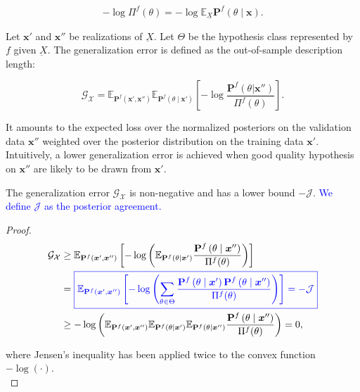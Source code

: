 $$
    - \log \Pi^f (\theta) = - \log \mathbb{E}_{\underline{X}} \mathbf{P}^f (\theta \mid \bm{x}).
$$

\begin{definition}
    Let $\bm{x'}$ and $\bm{x''}$ be realizations of $\underbar{X}$.
    Let $\Theta$ be the hypothesis class represented by $f$ given $\underbar{X}$. 
    The generalization error is defined as the out-of-sample description length:

    $$
        \mathcal{G}_{\mathcal{X}} = \mathbb{E}_{\mathbf{P}^f(\bm{x}', \bm{x}'')} \mathbb{E}_{\mathbf{P}^f( \theta \mid \bm{x}')} \left[ - \log \frac{\mathbf{P}^f(\theta | \bm{x}'')}{\Pi^f (\theta)} \right].
    $$
    
\end{definition}

It amounts to the expected loss over the normalized posteriors on the validation data
$\bm{x}''$ weighted over the posterior distribution on the training data $\bm{x}'$.
Intuitively, a lower generalization error is achieved when good quality hypothesis
on $\bm{x}''$ are likely to be drawn from $\bm{x}'$. 


\begin{lemma}\label{lemma:pa}
    The generalization error $\mathcal{G}_{\mathcal{X}}$ is non-negative and has a lower bound $-\mathcal{J}$. 
    \textcolor{blue}{We define $\mathcal{J}$ as the posterior agreement.}
\end{lemma}
\begin{proof}
    $$
    \begin{aligned}
        \mathcal{G}_{\mathcal{X}} & \geq \mathbb{E}_{\mathbf{P}^f(\bm{x}', \bm{x}'')}\left[-\log \left(\mathbb{E}_{\mathbf{P}^f( \theta \mid \bm{x}')} \frac{\mathbf{P}^{f}\left(\theta \mid \bm{x}''\right)}{\Pi^{f}(\theta)}\right)\right] \\
        & = \textcolor{blue}{\boxed{\mathbb{E}_{\mathbf{P}^f(\bm{x}', \bm{x}'')} \left[-\log \left(\sum_{\theta \in \Theta} \frac{\mathbf{P}^{f}\left(\theta \mid \bm{x}'\right) \mathbf{P}^{f}\left(\theta \mid \bm{x}'' \right)}{\Pi^{f}(\theta)}\right)\right] = -\mathcal{J}}} \\
        & \geq-\log \left(\mathbb{E}_{\mathbf{P}^f(\bm{x}', \bm{x}'')} \mathbb{E}_{\mathbf{P}^f( \theta \mid \bm{x}')} \mathbb{E}_{\mathbf{P}^f(\theta \mid \bm{x}'')} \frac{\mathbf{P}^{f}\left(\theta \mid \bm{x}''\right)}{\Pi^{f}(\theta)}\right)=0,
    \end{aligned}
    $$

where Jensen's inequality has been applied twice to the convex function $-\log(\cdot)$. \\

\end{proof}

